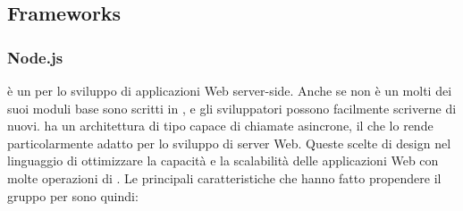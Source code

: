 \documentclass[12pt,a4paper]{article}
\begin{document}

\subsection{Frameworks}

\subsubsection{Node.js}\label{node.js}
 è un   per lo sviluppo di applicazioni Web server-side. Anche se  non è un   molti dei suoi moduli base  sono scritti in , e gli sviluppatori possono facilmente scriverne di nuovi.  ha un architettura di tipo  capace di chiamate  asincrone, il che lo rende particolarmente adatto per lo sviluppo di server Web. Queste scelte di design nel linguaggio di ottimizzare la capacità e la scalabilità delle applicazioni Web con molte operazioni di .
Le principali caratteristiche che hanno fatto propendere il gruppo per  sono quindi:
\end{document}
